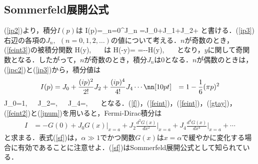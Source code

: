 \subsection{Sommerfeld展開公式}
(\ref{ip2})より，積分$I(p)$は
\be\label{ip3}
I(p)=\displaystyle\sum_{n=0}^{\infty}J_n
=J_0+J_1+J_2+\cdots
\ee
と書ける．(\ref{ip3})右辺の各項の$J_n,\ \ (n=0,1,2,\ldots)$の値について考える．$n$が奇数のとき，(\ref{feint3})の被積分関数
\be
H(y)\equiv{},\ \ \ 
\ee
は
\be
H(-y)=
=--H(y),\ \ \ 
\ee
となり，$y$に関して奇関数となる．したがって，$n$が奇数のとき，積分$J_n$は$0$となる．$n$が偶数のときは，(\ref{ipc2})と(\ref{ip3})から，積分値は
\begin{align}
I(p)&
=J_0+\frac{(ip)^2}{2!}J_2+\frac{(ip)^4}{4!}J_4\cdots\nn[10pt]
&=1-\frac{1}{6}(\pi p)^2
\end{align}
\be\label{jnum}
J_0=1,\ \ \ J_2=,\ \ \ J_4=,\ \ \ \cdots
\ee
となる．(\ref{f})，(\ref{feint})，(\ref{feint})，(\ref{gtay})，(\ref{feint2})と(\ref{jnum})を用いると，Fermi-Dirac積分は
\begin{align}
I&=-G(0)
+J_0G(x)\Bigr|_{x=a}+J_2\frac{d^2G(x)}{dx^2}\Bigr|_{x=a}+J_4\frac{d^4G(x)}{dx^4}\Bigr|_{x=a}+\cdots
\end{align}
\be\label{sf}
\ee
と求まる．表式(\ref{sf})は，$\alpha\gg1$でかつ関数$G(x)$は$x=\alpha$で緩やかに変化する場合に有効であることに注意せよ．(\ref{sf})はSommerfeld展開公式として知られている．




























%
